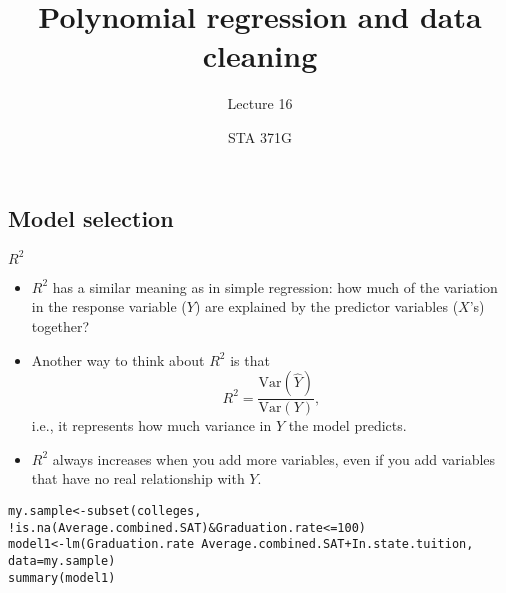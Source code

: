 \documentclass{beamer}\usepackage[]{graphicx}\usepackage[]{color}
\title{Polynomial regression and data cleaning}
\subtitle{Lecture 16}
\author{STA 371G}
\makeatletter
\newcommand{\hlnum}[1]{\textcolor[rgb]{0.824,0.412,0.118}{#1}}%
\newcommand{\hlopt}[1]{\textcolor[rgb]{1,0.894,0.769}{#1}}%
\newcommand{\hlstd}[1]{\textcolor[rgb]{1,0.894,0.769}{#1}}%
\newcommand{\hlkwb}[1]{\textcolor[rgb]{0.804,0.776,0.451}{#1}}%
\newcommand{\hlkwc}[1]{\textcolor[rgb]{0.78,0.941,0.545}{#1}}%
\newcommand{\hlkwd}[1]{\textcolor[rgb]{1,0.78,0.769}{#1}}%
\newenvironment{kframe}{%
 \def\at@end@of@kframe{}%
 \ifinner\ifhmode%
  \def\at@end@of@kframe{\end{minipage}}%
  \begin{minipage}{\columnwidth}%
 \fi\fi%
 \def\FrameCommand##1{\hskip\@totalleftmargin \hskip-\fboxsep
 \colorbox{shadecolor}{##1}\hskip-\fboxsep
     \hskip-\linewidth \hskip-\@totalleftmargin \hskip\columnwidth}%
 \MakeFramed {\advance\hsize-\width
   \@totalleftmargin\z@ \linewidth\hsize
   \@setminipage}}%
 {\par\unskip\endMakeFramed%
 \at@end@of@kframe}
\newenvironment{knitrout}{}{} %
\makeatother
\begin{document}
  
  

  \frame{\maketitle}



  \begin{darkframes}
    \section{Model selection}

    \begin{frame}{$R^2$}
      \begin{itemize}[<+->]
        \item $R^2$ has a similar meaning as in simple regression: how much of the variation in the response variable ($Y$) are explained by the predictor variables ($X$'s) together?
        \item Another way to think about $R^2$ is that \[ R^2 = \frac{\text{Var}(\hat Y)}{\text{Var}(Y)}, \] i.e., it represents how much variance in $Y$ the model predicts.
        \item $R^2$ always increases when you add more variables, \alert{even if you add variables that have no real relationship with $Y$}.
      \end{itemize}
    \end{frame}

    \begin{frame}[fragile]
      
      \fontsize{8}{8}
\begin{knitrout}
\color{fgcolor}\begin{kframe}
\begin{alltt}
\hlstd{my.sample} \hlkwb{<-} \hlkwd{subset}\hlstd{(colleges,}
  \hlopt{!}\hlkwd{is.na}\hlstd{(Average.combined.SAT)} \hlopt{&} \hlstd{Graduation.rate} \hlopt{<=} \hlnum{100}\hlstd{)}
\hlstd{model1} \hlkwb{<-} \hlkwd{lm}\hlstd{(Graduation.rate} \hlopt{~} \hlstd{Average.combined.SAT} \hlopt{+} \hlstd{In.state.tuition,}
             \hlkwc{data}\hlstd{=my.sample)}
\hlkwd{summary}\hlstd{(model1)}
\end{alltt}
\begin{verbatim}


\end{verbatim}
\end{kframe}
\end{knitrout}
\end{frame}
\end{darkframes}
\end{document}
